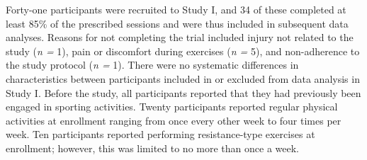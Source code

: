 \documentclass[twoside,10pt]{gihclass} %
\begin{document}
Forty-one participants were recruited to Study I, and 34 of these completed at least 85\% of the prescribed sessions and were thus included in subsequent data analyses. Reasons for not completing the trial included injury not related to the study (\emph{n =} 1), pain or discomfort during exercises (\emph{n =} 5), and non-adherence to the study protocol (\emph{n =} 1). There were no systematic differences in characteristics between participants included in or excluded from data analysis in Study I. Before the study, all participants reported that they had previously been engaged in sporting activities. Twenty participants reported regular physical activities at enrollment ranging from once every other week to four times per week. Ten participants reported performing resistance-type exercises at enrollment; however, this was limited to no more than once a week.
\end{document}
